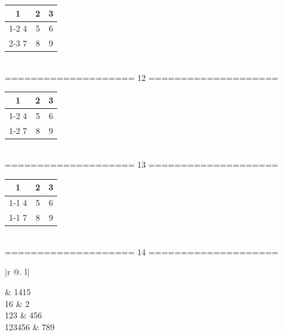 \documentclass[12pt, a4paper, onecolumn]{article}
\begin{document}
\begin{center}
\begin{tabular}{|c|c|c|}
	
	\hline
	1 & 2 & 3\\
	\cline{1-2}
	4 & 5 & 6\\
	\cline{2-3}
	7 & 8 & 9\\
	\hline
	
\end{tabular}\\[20pt]



====================  12  ====================\\[15pt]
%

\begin{tabular}{|c|c|c|}
	
	\hline
	1 & 2 & 3\\
	\cline{1-2}
	4 & 5 & 6\\
	\cline{1-2}
	7 & 8 & 9\\
	\hline
	
\end{tabular}\\[20pt]



====================  13  ====================\\[15pt]
%

\begin{tabular}{|c|c|c|}
	
	\hline
	1 & 2 & 3\\
	\cline{1-1}
	4 & 5 & 6\\
	\cline{1-1}
	7 & 8 & 9\\
	\hline
	
\end{tabular}\\[20pt]



====================  14  ====================\\[15pt]

\begin{tabular}{|r @. l|} %
	
	 & 1415\\
	16 & 2\\
	123 & 456\\
	123456 & 789\\
	\hline
	

\end{tabular}
\end{center}
\end{document}
